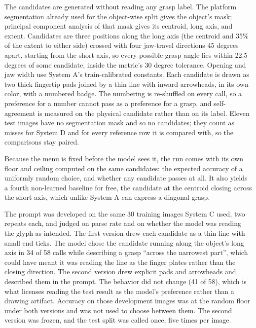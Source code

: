 \documentclass[12pt,letterpaper]{article}
\begin{document}
The candidates are generated without reading any grasp label. The
platform segmentation already used for the object-wise split gives the
object's mask; principal component analysis of that mask gives its
centroid, long axis, and extent. Candidates are three positions along
the long axis (the centroid and 35\% of the extent to either side)
crossed with four jaw-travel directions 45 degrees apart, starting from
the short axis, so every possible grasp angle lies within 22.5 degrees
of some candidate, inside the metric's 30 degree tolerance. Opening and
jaw width use System A's train-calibrated constants. Each candidate is
drawn as two thick fingertip pads joined by a thin line with inward
arrowheads, in its own color, with a numbered badge. The numbering is
re-shuffled on every call, so a preference for a number cannot pass as
a preference for a grasp, and self-agreement is measured on the
physical candidate rather than on its label. Eleven test images have no
segmentation mask and so no candidates; they count as misses for
System D and for every reference row it is compared with, so the
comparisons stay paired.

Because the menu is fixed before the model sees it, the run comes with
its own floor and ceiling computed on the same candidates: the expected
accuracy of a uniformly random choice, and whether any candidate passes
at all. It also yields a fourth non-learned baseline for free, the
candidate at the centroid closing across the short axis, which unlike
System A can express a diagonal grasp.

The prompt was developed on the same 30 training images System C used,
two repeats each, and judged on parse rate and on whether the model was
reading the glyph as intended. The first version drew each candidate as
a thin line with small end ticks. The model chose the candidate running
along the object's long axis in 34 of 58 calls while describing a grasp
``across the narrowest part'', which could have meant it was reading the
line as the finger plates rather than the closing direction. The second
version drew explicit pads and arrowheads and described them in the
prompt. The behavior did not change (41 of 58), which is what licenses
reading the test result as the model's preference rather than a
drawing artifact. Accuracy on those development images was at the
random floor under both versions and was not used to choose between
them. The second version was frozen, and the test split was called
once, five times per image.
\end{document}
